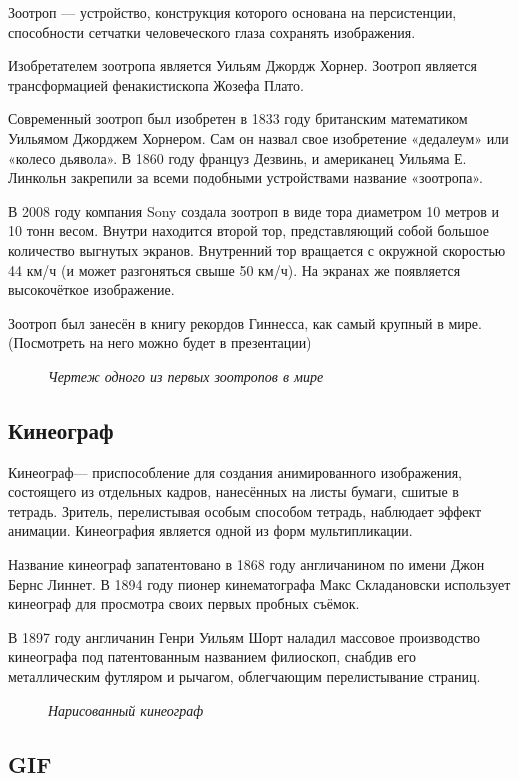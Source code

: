 \documentclass[a4paper, 12pt]{article}
\newcommand{\image}[3]{
	\begin{figure}[ht]
		\center{\texttt{[image: img/\#1]} }
		\caption{\textit{#3}}\end{figure}
}
\begin{document}
Зоотроп — устройство, конструкция которого основана на персистенции,
способности сетчатки человеческого глаза сохранять изображения.


Изобретателем зоотропа является Уильям Джордж Хорнер. Зоотроп является
трансформацией фенакистископа Жозефа Плато.


Современный зоотроп был изобретен в 1833 году британским математиком
Уильямом Джорджем Хорнером. Сам он назвал свое изобретение «дедалеум»
или «колесо дьявола». В 1860 году француз Дезвинь, и американец Уильяма Е.
Линкольн закрепили за всеми подобными устройствами название «зоотропа».


В 2008 году компания Sony создала зоотроп в виде тора диаметром 10 метров
и 10 тонн весом. Внутри находится второй тор, представляющий собой
большое количество выгнутых экранов. Внутренний тор вращается с
окружной скоростью 44 км/ч (и может разгоняться свыше 50 км/ч). На экранах
же появляется высокочёткое изображение.


Зоотроп был занесён в книгу рекордов Гиннесса, как самый крупный в мире.
(Посмотреть на него можно будет в презентации)

\image{зоотроп.jpg}{250}{Чертеж одного из первых зоотропов в мире}

\newpage

\subsection{Кинеограф}

Кинеограф— приспособление для создания анимированного
изображения, состоящего из отдельных кадров, нанесённых на листы бумаги,
сшитые в тетрадь. Зритель, перелистывая особым способом тетрадь,
наблюдает эффект анимации. Кинеография является одной из форм
мультипликации.


Название кинеограф запатентовано в 1868 году англичанином по имени Джон
Бернс Линнет. В 1894 году пионер кинематографа Макс Складановски
использует кинеограф для просмотра своих первых пробных съёмок.


В 1897 году англичанин Генри Уильям Шорт наладил массовое производство
кинеографа под патентованным названием филиоскоп, снабдив его
металлическим футляром и рычагом, облегчающим перелистывание страниц.

\image{Кинеограф.jpg}{300}{Нарисованный кинеограф}

\subsection{GIF}
\end{document}
